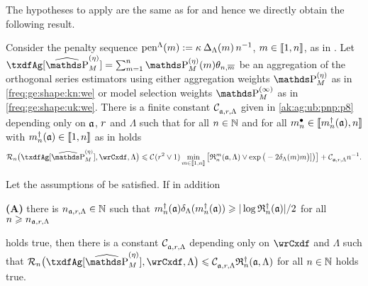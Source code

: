 The hypotheses to apply  are the same as for  and hence we directly obtain the following result.

\begin{thm}
Consider the penalty sequence $\penSv:=\penD$, $\Di\in\nset{1,n}$, as in .
Let $\txdfAg[{\erWe[]}]=\sum_{\Di=1}^{\ssY} \We\txdfPr$ be an aggregation of the orthogonal series estimators using either aggregation weights $\rWe[]$ as in \eqref{freq:ge:shape:kn:we} or model selection weights $\msWe[]$ as in \eqref{freq:ge:shape:uk:we}. %
There is a finite constant $\cst{\xdfCw[],\xdfCr,\Lambda}$ given in
\eqref{ak:ag:ub:pnp:p8} depending only on $\xdfCw[]$, $\xdfCr$ and $\Lambda$ such that for all
$\ssY\in\Nz$ and for all $\sDi{\ssY}\in\nset{\aDi{\ssY}(\xdfCw[]),\ssY}$  with
 $\aDi{\ssY}(\xdfCw[])\in\nset{1,n}$ as in  holds 
 \begin{equation}
 \nRi{\txdfAg[{\erWe[]}]}{\rwCxdf,\Lambda}
    \leq 
   \cst{}(\xdfCr^2\vee1)\min_{\Di\in\nset{1,\ssY}}\big[\daRa{\Di}{(\xdfCw[],\Lambda)}\vee\exp\big(-2\cmiSv\Di\big)]\big)\big]
   +\cst{\xdfCw[],\xdfCr,\Lambda}\ssY^{-1}.
\end{equation}
\reEnd
\end{thm}

\begin{cor}
  Let the assumptions of  be satisfied.  If in
  addition
  \begin{inparaenum}\item[{{\dgrau\bfseries(A)}}]
    there is $\ssY_{\xdfCw[],\xdfCr,\Lambda}\in\Nz$  such that
    $\aDi{\ssY}({\xdfCw[]})\cmSv[\aDi{\ssY}({\xdfCw[]})]\geq \vert \log\naRa{(\xdfCw[])} \vert/2 $
    for all $\ssY\geq \ssY_{\xdfCw[],\xdfCr,\Lambda}$
  \end{inparaenum}
  holds true, then there is a constant $\cst{\xdfCw[],\xdfCr,\Lambda}$
  depending only on $\rwCxdf$ and $\Lambda$ such that
  $ \nRi{\txdfAg[{\erWe[]}]}{\rwCxdf,\Lambda} \leq
  \cst{\xdfCw[],\xdfCr,\Lambda}\naRa{(\xdfCw[],\Lambda)}$ for all $n\in\Nz$
  holds true.
  \reEnd
\end{cor}

